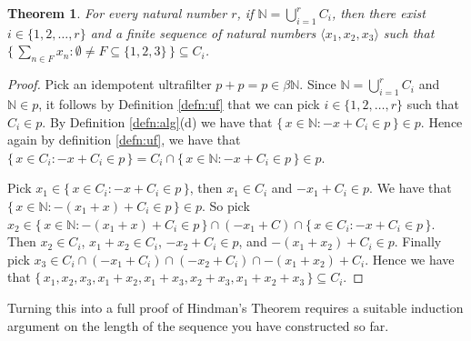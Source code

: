 \documentclass[12pt]{article}
\theoremstyle{plain}
\newtheorem{thm}{Theorem}[section]
\theoremstyle{definition}
\newcommand{\bbN}{\mathbb{N}}
\newcommand{\la}{\langle}
\newcommand{\ra}{\rangle}
\begin{document}
  \begin{thm}
    For every natural number $r$, if  \/ $\bbN = \bigcup_{i=1}^r C_i$,
    then there exist $i \in \{1, 2, \ldots, r\}$ and a finite sequence
    of natural numbers $\la x_1, x_2, x_3 \ra$ such that $\bigl\{\,
    \sum_{n\in F} x_n : \emptyset \ne F \subseteq \{1,2,3\} \,\bigr\}
    \subseteq C_i$.
  \end{thm}
  \begin{proof}
    Pick an idempotent ultrafilter $p + p = p \in \beta\bbN$. 
    Since $\bbN = \bigcup_{i=1}^r C_i$ and $\bbN \in p$, it follows by
    Definition \ref{defn:uf} that we can pick $i \in \{1, 2, \ldots,
    r\}$ such that $C_i \in p$. 
    By Definition \ref{defn:alg}(d) we have that $\{\, x \in \bbN : -x
    + C_i \in p \,\} \in p$.
    Hence again by definition \ref{defn:uf}, we have that $\{\, x \in
    C_i : -x + C_i \in p \,\} = C_i \cap
    \{\, x \in \bbN : -x + C_i \in p \,\} \in p$.

    Pick $x_1 \in \{\,x \in C_i: -x + C_i \in p \,\}$, then
    $x_1 \in C_i$ and $-x_1 + C_i \in p$. 
    We have that $\{\,x \in \bbN : -(x_1+x)+C_i \in p \,\} \in p$.
    So pick $x_2 \in \{\, x \in \bbN : -(x_1+x)+C_i \in p \,\} \cap
    (-x_1+C) \cap \{\, x \in C_i : -x+C_i \in p \,\}$.
    Then $x_2 \in C_i$, $x_1+x_2 \in C_i$, $-x_2 + C_i \in p$, and
    $-(x_1 + x_2) + C_i \in p$.
    Finally pick $x_3 \in C_i \cap (-x_1+C_i) \cap (-x_2+C_i) \cap
    -(x_1+x_2) + C_i$. 
    Hence we have that $\{\, x_1, x_2, x_3, x_1+x_2, x_1+x_3, x_2+x_3,
    x_1+x_2+x_3 \,\} \subseteq C_i$.
  \end{proof}
Turning this into a full proof of Hindman's Theorem requires a
suitable induction argument on the length of the sequence you have
constructed so far. 
\end{document}
